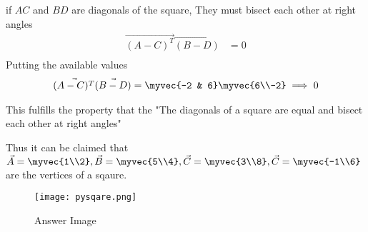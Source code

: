 \documentclass[journal,12pt,twocolumn]{IEEEtran}
\begin{document}
if $AC$ and $BD$ are diagonals of the square, They must bisect each other at right angles
\begin{align}
\vec{(A-C)^T}\vec{(B-D)}&=0\\
\end{align}
Putting the available values
\begin{align}
\vec{(A-C)^T}\vec{(B-D)}=\myvec {-2 & 6}\myvec {6\\-2}\implies 0
\end{align}





This fulfills the property that the "The diagonals of a square are equal and bisect each other at right angles" 

Thus it can be claimed that $\vec {A}=\myvec {1\\2},
\vec {B}=\myvec {5\\4},
\vec {C}=\myvec {3\\8},
\vec {C}=\myvec {-1\\6}$ are the vertices of a sqaure.

   



\begin{figure}[h!]
\texttt{[image: pysqare.png]}
  \caption{Answer Image}
  \label{Answer Image}
\end{figure}
\end{document}
